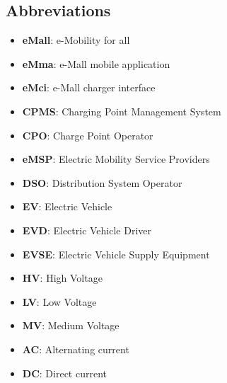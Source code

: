 \subsection{Abbreviations}
\begin{itemize}
    \item \textbf{eMall}: e-Mobility for all
    \item \textbf{eMma}: e-Mall mobile application
    \item \textbf{eMci}: e-Mall charger interface
    \item \textbf{CPMS}: Charging Point Management System
    \item \textbf{CPO}: Charge Point Operator
    \item \textbf{eMSP}: Electric Mobility Service Providers
    \item \textbf{DSO}: Distribution System Operator
    \item \textbf{EV}: Electric Vehicle
    \item \textbf{EVD}: Electric Vehicle Driver
    \item \textbf{EVSE}: Electric Vehicle Supply Equipment
    \item \textbf{HV}: High Voltage
    \item \textbf{LV}: Low Voltage
    \item \textbf{MV}: Medium Voltage
    \item \textbf{AC}: Alternating current
    \item \textbf{DC}: Direct current
\end{itemize}

